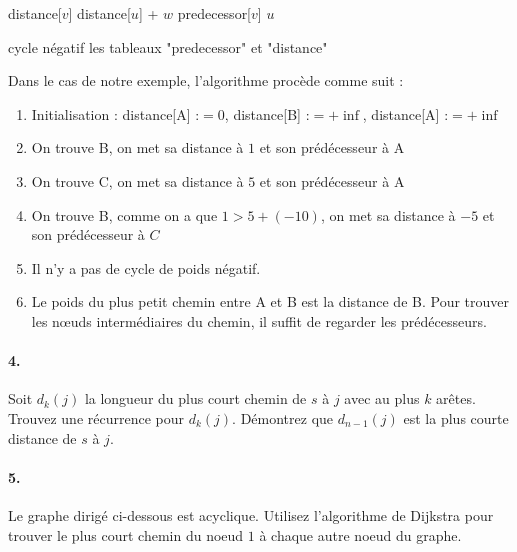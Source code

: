 \begin{solution}
\begin{algorithm}[h!]
\begin{algorithmic}
				
							\STATE distance[$v$] \leftarrow distance[$u$] + $w$
							\STATE predecessor[$v$] \leftarrow $u$
						\ENDIF
					\ENDFOR			
				\ENDFOR
				
				
						\RETURN cycle négatif
					\ENDIF
				\ENDFOR
				\RETURN les tableaux "predecessor" et "distance"
			\end{algorithmic}
		\end{algorithm}	
		
		Dans le cas de notre exemple, l'algorithme procède comme suit :
		\begin{enumerate}
			\item Initialisation : distance[A] :$= 0$, distance[B] :$= +\inf$, distance[A] :$= +\inf$
			\item On trouve B, on met sa distance à $1$ et son prédécesseur à A
			\item On trouve C, on met sa distance à $5$ et son prédécesseur à A
			\item On trouve B, comme on a que $1>5+(-10)$, on met sa distance à $-5$ et son prédécesseur à $C$
			\item Il n'y a pas de cycle de poids négatif.
			\item Le poids du plus petit chemin entre A et B est la distance de B. Pour trouver les nœuds intermédiaires du chemin, il suffit de regarder les prédécesseurs.
		\end{enumerate}
\end{solution}

\paragraph{4. } Soit $d_k(j)$ la longueur du plus court chemin de $s$ à $j$ avec au plus $k$ arêtes. Trouvez une récurrence pour $d_k(j)$. Démontrez que $d_{n-1}(j)$ est la plus courte distance de $s$ à $j$.

\begin{solution}
  \nosolution
\end{solution}

\paragraph{5. } Le graphe dirigé ci-dessous est acyclique. Utilisez l'algorithme de Dijkstra pour trouver le plus court chemin du noeud $1$ à chaque autre noeud du graphe.

